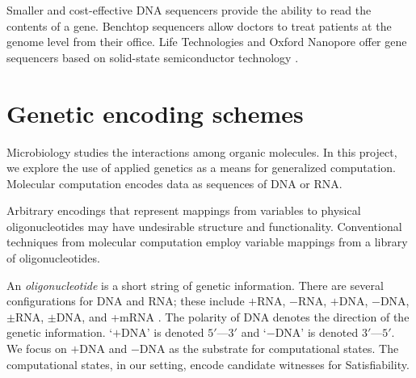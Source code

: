 Smaller and cost-effective DNA sequencers provide the ability to read the contents of a gene.  Benchtop sequencers \cite{ionTorrent, oxfordNanopore} allow doctors to treat patients at the genome level from their office.  Life Technologies and Oxford Nanopore offer gene sequencers based on solid-state semiconductor technology \cite{ionTorrent, oxfordNanopore}.	

\section{Genetic encoding schemes}

	Microbiology studies the interactions among organic molecules.  In this project, we explore the use of applied genetics as a means for generalized computation.  Molecular computation encodes data as sequences of DNA or RNA.  

	Arbitrary encodings that represent mappings from variables to physical oligonucleotides may have undesirable structure and functionality.  Conventional techniques from molecular computation employ variable mappings from a library of oligonucleotides.
	
		

	
	An \textit{oligonucleotide} is a short string of genetic information.  There are several configurations for DNA and RNA; these include $+$RNA, $-$RNA, $+$DNA, $-$DNA, $\pm$RNA, $\pm$DNA, and +mRNA \cite{baltimore1971exp}.  The polarity of DNA denotes the direction of the genetic information.  `$+$DNA' is denoted $5'$---$3'$ and `$-$DNA' is denoted $3'$---$5'$.  We focus on $+$DNA and $-$DNA as the substrate for computational states.  The computational states, in our setting, encode candidate witnesses for {\sc Satisfiability}.


